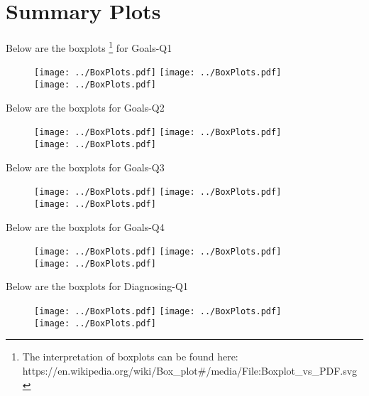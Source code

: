 \documentclass[11pt]{extarticle} %
\begin{document}
\newpage

\section*{Summary Plots}
Below are the boxplots {\footnote{The interpretation of boxplots can be found here: https://en.wikipedia.org/wiki/Box\_plot\#/media/File:Boxplot\_vs\_PDF.svg}} for Goals-Q1
\begin{figure}[H]
\centering 
\texttt{[image: ../BoxPlots.pdf]}
\texttt{[image: ../BoxPlots.pdf]} \\
\texttt{[image: ../BoxPlots.pdf]}
\end{figure}

\newpage
Below are the boxplots for Goals-Q2
\begin{figure}[H]
\centering 
\texttt{[image: ../BoxPlots.pdf]} 
\texttt{[image: ../BoxPlots.pdf]} \\
\texttt{[image: ../BoxPlots.pdf]} \\
\end{figure}

\newpage
Below are the boxplots for Goals-Q3
\begin{figure}[H]
\centering 
\texttt{[image: ../BoxPlots.pdf]} 
\texttt{[image: ../BoxPlots.pdf]} \\
\texttt{[image: ../BoxPlots.pdf]} \\
\end{figure}

\newpage
Below are the boxplots for Goals-Q4
\begin{figure}[H]
\centering 
\texttt{[image: ../BoxPlots.pdf]} 
\texttt{[image: ../BoxPlots.pdf]} \\
\texttt{[image: ../BoxPlots.pdf]} \\
\end{figure}

\newpage
Below are the boxplots for Diagnosing-Q1
\begin{figure}[H]
\centering 
\texttt{[image: ../BoxPlots.pdf]} 
\texttt{[image: ../BoxPlots.pdf]} \\
\texttt{[image: ../BoxPlots.pdf]} \\
\end{figure}
\end{document}
